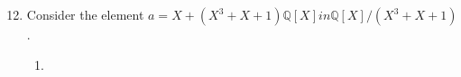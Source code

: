 \documentclass{article}
\begin{document}
\author{Puts, G.J.C. - 1232041}
\title{}
\date{\today}
\newpage
\begin{enumerate}
\setcounter{enumi}{11}
\item Consider the element $a=X+(X^{3}+X+1)\mathbb{Q}[X] in \mathbb{Q}[X]/(X^{3}+X+1)$.
\begin{enumerate}
\item 
\end{enumerate}
\end{enumerate}
\end{document}
